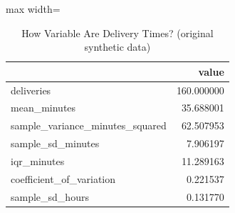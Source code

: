 \begin{table}[htbp]
\centering
\caption{How Variable Are Delivery Times? (original synthetic data)}
\begingroup
\small
\setlength{\tabcolsep}{6pt}
\renewcommand{\arraystretch}{1.12}
\begin{adjustbox}{max width=\linewidth}
\begin{tabular}{@{}lr@{}}
\toprule
 & value \\
\midrule
deliveries & 160.000000 \\
mean\_minutes & 35.688001 \\
sample\_variance\_minutes\_squared & 62.507953 \\
sample\_sd\_minutes & 7.906197 \\
iqr\_minutes & 11.289163 \\
coefficient\_of\_variation & 0.221537 \\
sample\_sd\_hours & 0.131770 \\
\bottomrule
\end{tabular}
\end{adjustbox}
\endgroup
\end{table}